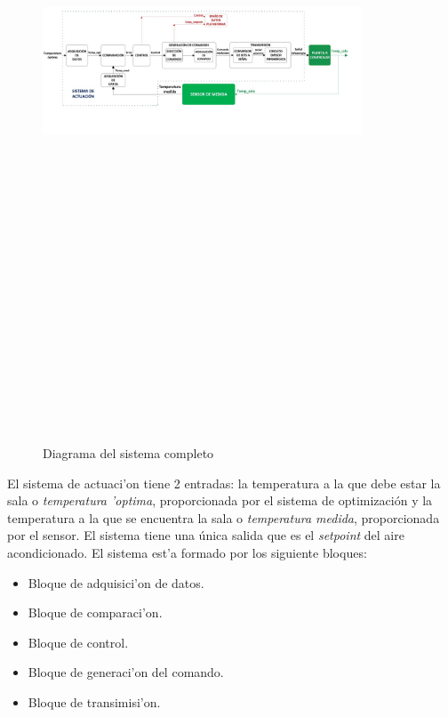 \begin{figure}[htbp]
  \centering
  \includegraphics[width=95mm, height=220mm]{imagenes/capitulo4/4_1Diagrama_Completo}
   \caption{Diagrama del sistema completo}
   \label{4_1:diag_completo}
\end{figure}

	El sistema de actuaci'on tiene 2 entradas: la temperatura a la que debe estar la sala o \textit{temperatura 'optima}, proporcionada por el sistema de optimización y la temperatura a la que se encuentra la sala o \textit{temperatura medida},  proporcionada por el sensor. El sistema tiene una única salida que es el \textit{setpoint} del aire acondicionado. El sistema est'a formado por los siguiente bloques:
\begin{itemize}
    	\item Bloque de adquisici'on de datos.
    	\item Bloque de comparaci'on.
    	\item Bloque de control.
    	\item Bloque de generaci'on del comando.
    	\item Bloque de transimisi'on.
\end{itemize}

